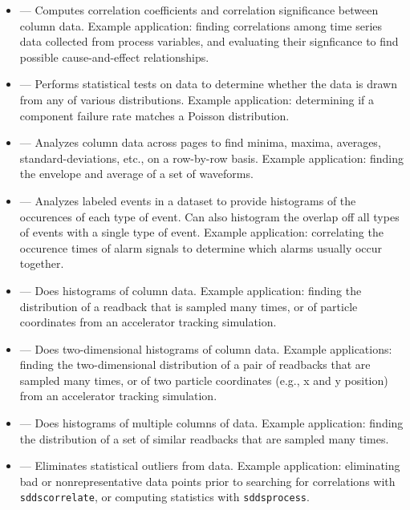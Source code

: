 \documentclass[11pt]{article}
\begin{document}
\begin{itemize}

\item {} --- Computes correlation coefficients and
correlation significance between column data.  Example application: finding correlations among time series data
collected from process variables, and evaluating their signficance to find possible cause-and-effect relationships.

\item {} --- Performs statistical tests on data to
determine whether the data is drawn from any of various distributions.
Example application: determining if a component failure rate matches a
Poisson distribution.

\item {} --- Analyzes column data across pages to find
minima, maxima, averages, standard-deviations, etc., on a row-by-row basis.   Example application: finding 
the envelope and average of a set of waveforms.

\item {} --- Analyzes labeled events in a dataset
to provide histograms of the occurences of each type of event.  Can
also histogram the overlap off all types of events with a single type
of event.  Example application: correlating the occurence times of
alarm signals to determine which alarms usually occur together.

\item {} --- Does histograms of column data.  Example application: finding the distribution of a
readback that is sampled many times, or of particle coordinates from an accelerator tracking simulation.

\item {} --- Does two-dimensional histograms of column data.  Example applications: finding the
two-dimensional distribution of a pair of readbacks that are sampled many times, or of two particle coordinates
(e.g., x and y position) from an accelerator tracking simulation.

\item {} --- Does histograms of multiple columns
of data.  Example application: finding the distribution of a set of
similar readbacks that are sampled many times.

\item {} --- Eliminates statistical outliers from data.  Example application: eliminating bad
or nonrepresentative data points prior to searching for correlations with \verb|sddscorrelate|, or computing
statistics with \verb|sddsprocess|.


\end{itemize}
\end{document}

